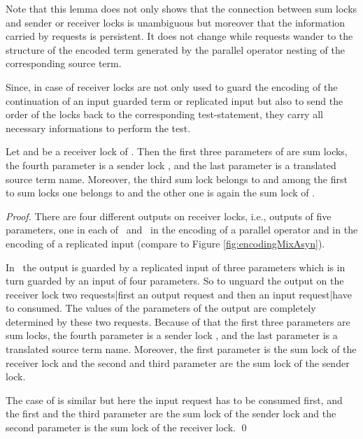 \documentclass[]{llncs}
\begin{document}
Note that this lemma does not only shows that the connection between sum locks and sender or receiver locks is unambiguous but moreover that the information carried by requests is persistent. It does not change while requests wander to the structure of the encoded term generated by the parallel operator nesting of the corresponding source term.

Since, in case of  receiver locks are not only used to guard the encoding of the continuation of an input guarded term or replicated input but also to send the order of the locks back to the corresponding test-statement, they carry all necessary informations to perform the test.

\begin{lemma} \label{lem:parametersReceiverLock}
	Let  and  be a receiver lock of . Then the first three parameters of  are sum locks, the fourth parameter is a sender lock , and the last parameter is a translated source term name. Moreover, the third sum lock belongs to  and among the first to sum locks one belongs to  and the other one is again the sum lock of .
\end{lemma}

\begin{proof}
	There are four different outputs on receiver locks, i.e., outputs of five parameters, one in each of \processRightOutputRequests \ and \processRightInputRequests \ in the encoding of a parallel operator and in the encoding of a replicated input (compare to Figure \ref{fig:encodingMixAsyn}).
	
	In \processRightOutputRequests \ the output  is guarded by a replicated input  of three parameters which is in turn guarded by an input  of four parameters. So to unguard the output on the receiver lock two requests|first an output request and then an input request|have to consumed. The values of the parameters of the output  are completely determined by these two requests. Because of that the first three parameters are sum locks, the fourth parameter is a sender lock , and the last parameter is a translated source term name. Moreover, the first parameter is the sum lock of the receiver lock and the second and third parameter are the sum lock of the sender lock.
	
	The case of \processRightInputRequests is similar but here the input request has to be consumed first, and the first and the third parameter are the sum lock of the sender lock and the second parameter is the sum lock of the receiver lock.
	\qed
\end{proof}
\end{document}
